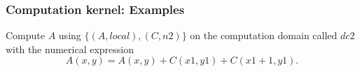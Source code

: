 \documentclass{beamer}
\begin{document}

\begin{frame}
\frametitle{Computation kernel: Examples}
\begin{center}
\hspace{10pt}
\end{center}
Compute $A$ using $\{(A,local),(C,n2)\}$ on the computation domain called $dc2$ with the numerical expression
\tiny
\begin{equation*}
A(x,y)=A(x,y)+C(x1,y1)+C(x1+1,y1).
\end{equation*}
\end{frame}
\end{document}
